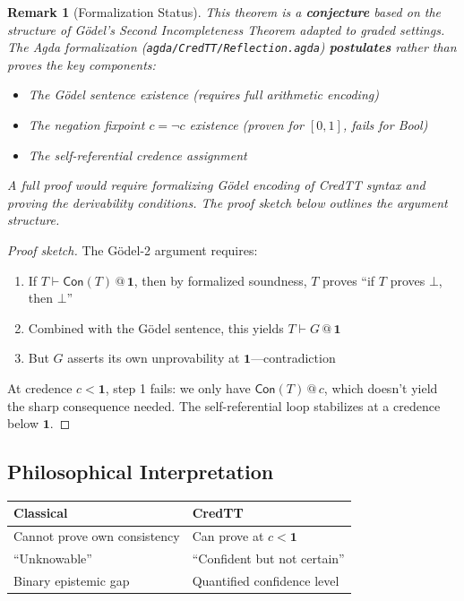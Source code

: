 \documentclass[11pt,a4paper]{article}
\makeatletter
\newtheorem{remark}{Remark}[section]
\newcommand{\at}[1]{\,@\,#1}
\newcommand{\one}{\mathbf{1}}
\newcommand{\negc}{\neg}
\makeatother
\begin{document}
\begin{remark}[Formalization Status]
This theorem is a \textbf{conjecture} based on the structure of G\"odel's Second Incompleteness Theorem adapted to graded settings. The Agda formalization (\texttt{agda/CredTT/Reflection.agda}) \textbf{postulates} rather than proves the key components:
\begin{itemize}
    \item The G\"odel sentence existence (requires full arithmetic encoding)
    \item The negation fixpoint $c = \negc c$ existence (proven for $[0,1]$, fails for Bool)
    \item The self-referential credence assignment
\end{itemize}
A full proof would require formalizing G\"odel encoding of CredTT syntax and proving the derivability conditions. The proof sketch below outlines the argument structure.
\end{remark}

\begin{proof}[Proof sketch]
The G\"odel-2 argument requires:
\begin{enumerate}
    \item If $T \vdash \mathsf{Con}(T) \at{\one}$, then by formalized soundness, $T$ proves ``if $T$ proves $\bot$, then $\bot$''
    \item Combined with the G\"odel sentence, this yields $T \vdash G \at{\one}$
    \item But $G$ asserts its own unprovability at $\one$---contradiction
\end{enumerate}

At credence $c < \one$, step 1 fails: we only have $\mathsf{Con}(T) \at{c}$, which doesn't yield the sharp consequence needed. The self-referential loop stabilizes at a credence below $\one$.
\end{proof}

\subsection{Philosophical Interpretation}

\begin{center}
\begin{tabular}{l|l}
\textbf{Classical} & \textbf{CredTT} \\
\hline
Cannot prove own consistency & Can prove at $c < \one$ \\
``Unknowable'' & ``Confident but not certain'' \\
Binary epistemic gap & Quantified confidence level \\
\end{tabular}
\end{center}
\end{document}
